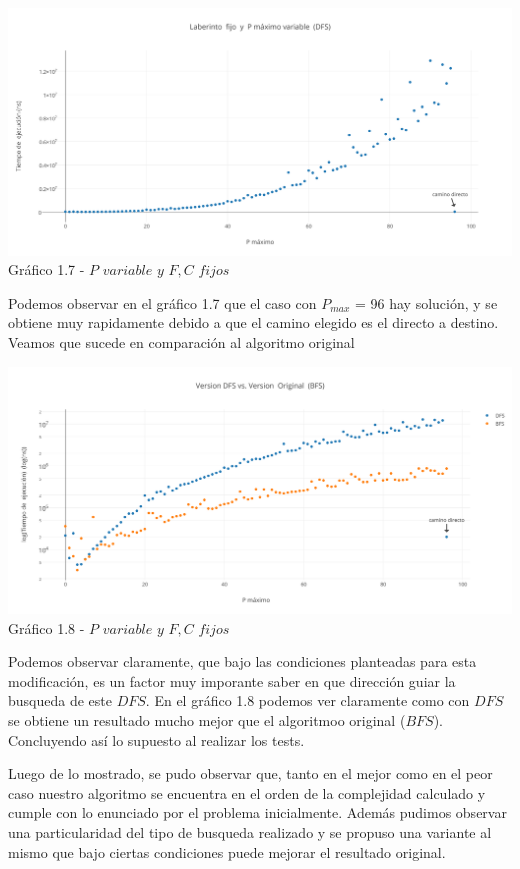   \begin{center}
\includegraphics[scale=0.6]{./EJ1/pVariableDfs.png}
{Gr\'afico 1.7 - $P$ $variable$ $y$ $F,C$ $fijos$}
  \end{center}
  \vspace*{0.3cm}

Podemos observar en el gráfico 1.7 que el caso con $P_{max}$ = 96 hay solución, y se obtiene muy rapidamente debido a que el camino elegido es el directo a destino. Veamos que sucede en comparación al algoritmo original

  \begin{center}
\includegraphics[scale=0.6]{./EJ1/bfsVsDfs.png}
{Gr\'afico 1.8 - $P$ $variable$ $y$ $F,C$ $fijos$}
  \end{center}
  \vspace*{0.3cm}
  
Podemos observar claramente, que bajo las condiciones planteadas para esta modificación, es un factor muy imporante saber en que dirección guiar la busqueda de este $DFS$. En el gráfico 1.8 podemos ver claramente como con $DFS$ se obtiene un resultado mucho mejor que el algoritmoo original ($BFS$). Concluyendo así lo supuesto al realizar los tests.

Luego de lo mostrado, se pudo observar que, tanto en el mejor como en el peor caso nuestro algoritmo se encuentra en el orden de la complejidad calculado y cumple con lo enunciado por el problema inicialmente. Además pudimos observar una particularidad del tipo de busqueda realizado y se propuso una variante al mismo que bajo ciertas condiciones puede mejorar el resultado original.

